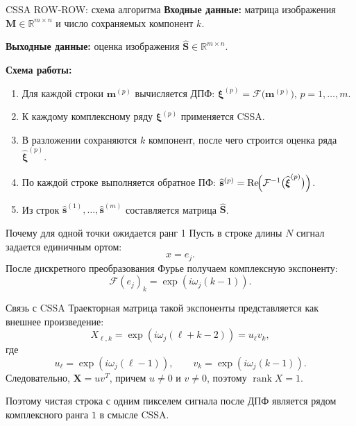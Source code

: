 \documentclass[unicode,notheorems]{beamer}
\begin{document}
\begin{frame}{CSSA ROW-ROW: схема алгоритма}
	\small
	\textbf{Входные данные:} матрица изображения $\mathbf{M}\in\mathbb{R}^{m\times n}$
	и число сохраняемых компонент $k$.

	\textbf{Выходные данные:} оценка изображения $\widehat{\mathbf{S}}\in\mathbb{R}^{m\times n}$.

	\vspace{0.2cm}
	\textbf{Схема работы:}
	\begin{enumerate}
		\item Для каждой строки $\mathbf{m}^{(p)}$ вычисляется ДПФ:
		$\boldsymbol{\xi}^{(p)} = \mathcal{F}\bigl(\mathbf{m}^{(p)}\bigr)$, $p=1,\dots,m$.
		\item К каждому комплексному ряду $\boldsymbol{\xi}^{(p)}$ применяется CSSA.
		\item В разложении сохраняются $k$ компонент, после чего строится оценка ряда $\widehat{\boldsymbol{\xi}}^{(p)}$.
		\item По каждой строке выполняется обратное ПФ:
		$\widehat{\mathbf{s}}^{(p)} = \operatorname{Re}\!\Bigl(\mathcal{F}^{-1}\bigl(\widehat{\boldsymbol{\xi}}^{(p)}\bigr)\Bigr)$.
		\item Из строк $\widehat{\mathbf{s}}^{(1)},\dots,\widehat{\mathbf{s}}^{(m)}$ составляется матрица $\widehat{\mathbf{S}}$.
	\end{enumerate}
\end{frame}

\begin{frame}[shrink=5]{Почему для одной точки ожидается ранг 1}
	\small
	Пусть в строке длины $N$ сигнал задается единичным ортом:
	\[
	x = e_j.
	\]
	После дискретного преобразования Фурье получаем комплексную экспоненту:
	\[
	\mathcal{F}(e_j)_k = \exp(i\omega_j(k-1)).
	\]

	\begin{block}{Связь с CSSA}
		Траекторная матрица такой экспоненты представляется как внешнее произведение:
		\[
		X_{\ell,k} = \exp(i\omega_j(\ell+k-2)) = u_{\ell}v_k,
		\]
		где
		\[
		u_{\ell}=\exp(i\omega_j(\ell-1)),\qquad
		v_k=\exp(i\omega_j(k-1)).
		\]
		Следовательно, $\mathbf{X}=uv^{T}$, причем $u\neq0$ и $v\neq0$, поэтому $\operatorname{rank}X=1$.
	\end{block}

	Поэтому чистая строка с одним пикселем сигнала после ДПФ является рядом комплексного ранга $1$ в смысле CSSA.
\end{frame}
\end{document}
